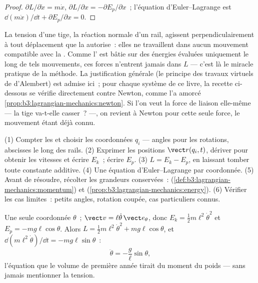 \begin{proof}
$\partial L/\partial\dot x = m\dot x$, $\partial L/\partial x =
-\partial E_p/\partial x$~; l'équation d'Euler--Lagrange est
$\dd(m\dot x)/\dd t + \partial E_p/\partial x = 0$.
\end{proof}

\begin{remark}\label{rem:b3:lagrangian-mechanics:constraints}
La tension d'une tige, la réaction normale d'un rail, agissent
perpendiculairement à tout déplacement que la  autorise~:
elles ne travaillent dans aucun mouvement compatible avec la
. Comme l' est bâtie sur des énergies évaluées
uniquement le long de tels mouvements, ces forces n'entrent jamais dans
$L$ --- c'est là le miracle pratique de la méthode. La justification
générale (le principe des travaux virtuels de d'Alembert) est admise
ici~; pour chaque système de ce livre, la recette ci-dessous se vérifie
directement contre Newton, comme l'a amorcé
\cref{prop:b3:lagrangian-mechanics:newton}. Si l'on veut la force de
liaison elle-même --- la tige va-t-elle casser~? ---, on revient à
Newton pour cette seule force, le mouvement étant déjà connu.
\end{remark}

\begin{method}\label{met:b3:lagrangian-mechanics:recipe}
(1) Compter les  et choisir les coordonnées $q_i$ ---
angles pour les rotations, abscisses le long des rails. (2) Exprimer
les positions $\vect r(q_i, t)$, dériver pour obtenir les vitesses et
écrire $E_k$~; écrire $E_p$. (3) $L = E_k - E_p$, en laissant tomber
toute constante additive. (4) Une équation d'Euler--Lagrange par
coordonnée. (5) Avant de résoudre, récolter les grandeurs conservées~:
 (\cref{def:b3:lagrangian-mechanics:momentum}) et
 (\cref{prop:b3:lagrangian-mechanics:energy}). (6)
Vérifier les cas limites~: petits angles, rotation coupée, cas
particuliers connus.
\end{method}

\begin{example}\label{ex:b3:lagrangian-mechanics:pendulum}
Une seule coordonnée $\theta$~; $\vect v = \ell\dot\theta\,\vect e_\theta$,
donc $E_k = \tfrac12 m\ell^2\dot\theta^2$ et $E_p = -mg\ell\cos\theta$.
Alors $L = \tfrac12 m\ell^2\dot\theta^2 + mg\ell\cos\theta$, et
$\dd(m\ell^2\dot\theta)/\dd t = -mg\ell\sin\theta$~:
\[
\ddot\theta = -\frac{g}{\ell}\sin\theta ,
\]
l'équation que le volume de première année tirait du moment du poids
--- sans jamais mentionner la tension.
\end{example}

